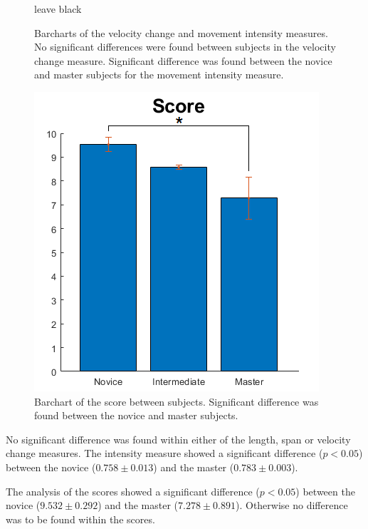 \begin{figure}[H]
{\begin{minipage}{0.46\linewidth}
			\caption{leave black}
			\label{fig:MovementIntensity}
		\end{minipage}
	}%
	\caption{Barcharts of the velocity change and movement intensity measures. No significant differences were found between subjects in the velocity change measure. Significant difference was found between the novice and master subjects for the movement intensity measure.}
\end{figure}

\begin{figure}[H]
	\includegraphics[width=.5\textwidth]{figures/Score}
	\caption{Barchart of the score between subjects. Significant difference was found between the novice and master subjects.}
	\label{fig:Score}  %
\end{figure}


No significant difference was found within either of the length, span or velocity change measures. The intensity measure showed a significant difference ($p<0.05$) between the novice ($0.758 \pm 0.013$) and the master ($0.783 \pm 0.003$).

The analysis of the scores showed a significant difference ($p<0.05$) between the novice ($9.532 \pm 0.292$) and the master ($7.278 \pm 0.891$). Otherwise no difference was to be found within the scores.
